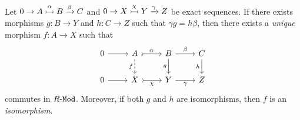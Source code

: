 \begin{proposition}
    \label{prop:unique-isomorphism-exact-sequences-left}
    Let \(0 \to A \overset{\alpha}{\rightarrowtail} B \xrightarrow \beta C\) and
    \(0 \to X \overset{\chi}{\rightarrowtail} Y \xrightarrow \gamma Z\) be exact sequences. If
    there exists morphisms \(g: B \to Y\) and \(h: C \to Z\) such that
    \(\gamma g =h \beta\), then there exists a \emph{unique} morphism \(f: A \to X\)
    such that
    \[
        \begin{tikzcd}
            0 \ar[r]
            &A \ar[r, tail, "\alpha"] \ar[d, dashed, "f"']
            &B \ar[r, "\beta"] \ar[d, "g"']
            &C \ar[d, "h"']
            \\
            0 \ar[r]
            &X \ar[r, tail, "\chi"']
            &Y \ar[r, "\gamma"']
            &Z
        \end{tikzcd}
    \]
    commutes in \({R\text{-}\texttt{Mod}}\). Moreover, if both \(g\) and \(h\) are isomorphisms,
    then \(f\) is an \emph{isomorphism}.
\end{proposition}

